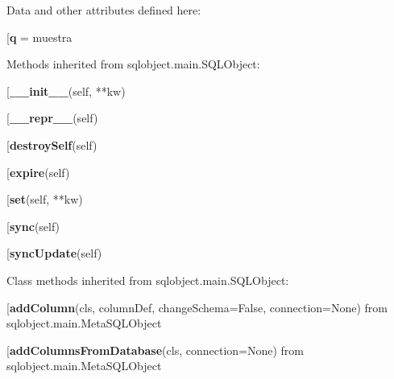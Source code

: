 Data and other attributes defined here:\\
\begin{description}\item[{\bf q} = muestra\end{description}


Methods inherited from sqlobject.main.SQLObject:\\
\begin{description}\item[{\bf \_\_init\_\_}(self, **kw)\end{description}

\begin{description}\item[{\bf \_\_repr\_\_}(self)\end{description}

\begin{description}\item[{\bf destroySelf}(self)\end{description}

\begin{description}\item[{\bf expire}(self)\end{description}

\begin{description}\item[{\bf set}(self, **kw)\end{description}

\begin{description}\item[{\bf sync}(self)\end{description}

\begin{description}\item[{\bf syncUpdate}(self)\end{description}


Class methods inherited from sqlobject.main.SQLObject:\\
\begin{description}\item[{\bf addColumn}(cls, columnDef, changeSchema=False, connection=None) from sqlobject.main.MetaSQLObject\end{description}

\begin{description}\item[{\bf addColumnsFromDatabase}(cls, connection=None) from sqlobject.main.MetaSQLObject\end{description}

